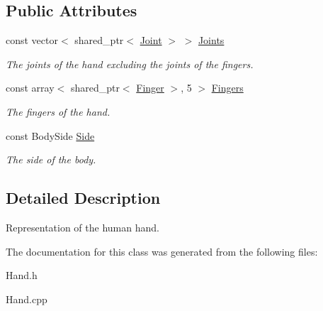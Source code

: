 \subsection*{Public Attributes}
\begin{DoxyCompactItemize}
\item 
const vector$<$ shared\+\_\+ptr$<$ \hyperlink{class_efficio_1_1_models_1_1_body_1_1_joint}{Joint} $>$ $>$ \hyperlink{class_efficio_1_1_models_1_1_body_1_1_hand_ad2392ad60a53131975a61c3f43095e82}{Joints}\hypertarget{class_efficio_1_1_models_1_1_body_1_1_hand_ad2392ad60a53131975a61c3f43095e82}{}\label{class_efficio_1_1_models_1_1_body_1_1_hand_ad2392ad60a53131975a61c3f43095e82}

\begin{DoxyCompactList}\small\item\em The joints of the hand excluding the joints of the fingers. \end{DoxyCompactList}\item 
const array$<$ shared\+\_\+ptr$<$ \hyperlink{class_efficio_1_1_models_1_1_body_1_1_finger}{Finger} $>$, 5 $>$ \hyperlink{class_efficio_1_1_models_1_1_body_1_1_hand_a2f8d98a62d1988c1aa7b65588c64952e}{Fingers}\hypertarget{class_efficio_1_1_models_1_1_body_1_1_hand_a2f8d98a62d1988c1aa7b65588c64952e}{}\label{class_efficio_1_1_models_1_1_body_1_1_hand_a2f8d98a62d1988c1aa7b65588c64952e}

\begin{DoxyCompactList}\small\item\em The fingers of the hand. \end{DoxyCompactList}\item 
const Body\+Side \hyperlink{class_efficio_1_1_models_1_1_body_1_1_hand_aa5a5ae2e6c7572c42f8ef975507b38ea}{Side}\hypertarget{class_efficio_1_1_models_1_1_body_1_1_hand_aa5a5ae2e6c7572c42f8ef975507b38ea}{}\label{class_efficio_1_1_models_1_1_body_1_1_hand_aa5a5ae2e6c7572c42f8ef975507b38ea}

\begin{DoxyCompactList}\small\item\em The side of the body. \end{DoxyCompactList}\end{DoxyCompactItemize}


\subsection{Detailed Description}
Representation of the human hand. 

The documentation for this class was generated from the following files\+:\begin{DoxyCompactItemize}
\item 
Hand.\+h\item 
Hand.\+cpp\end{DoxyCompactItemize}

